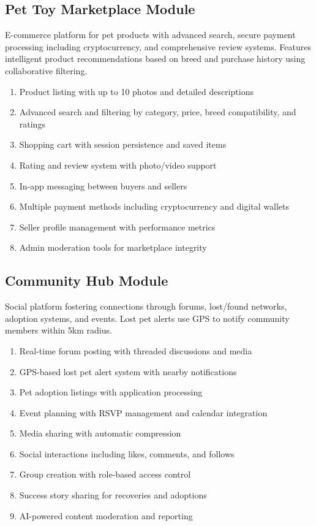 \subsection{Pet Toy Marketplace Module}

E-commerce platform for pet products with advanced search, secure payment processing including cryptocurrency, and comprehensive review systems. Features intelligent product recommendations based on breed and purchase history using collaborative filtering.

\begin{enumerate}
    \item Product listing with up to 10 photos and detailed descriptions
    \item Advanced search and filtering by category, price, breed compatibility, and ratings
    \item Shopping cart with session persistence and saved items
    \item Rating and review system with photo/video support
    \item In-app messaging between buyers and sellers
    \item Multiple payment methods including cryptocurrency and digital wallets
    \item Seller profile management with performance metrics
    \item Admin moderation tools for marketplace integrity
\end{enumerate}

\subsection{Community Hub Module}

Social platform fostering connections through forums, lost/found networks, adoption systems, and events. Lost pet alerts use GPS to notify community members within 5km radius.

\begin{enumerate}
    \item Real-time forum posting with threaded discussions and media
    \item GPS-based lost pet alert system with nearby notifications
    \item Pet adoption listings with application processing
    \item Event planning with RSVP management and calendar integration
    \item Media sharing with automatic compression
    \item Social interactions including likes, comments, and follows
    \item Group creation with role-based access control
    \item Success story sharing for recoveries and adoptions
    \item AI-powered content moderation and reporting
\end{enumerate}

